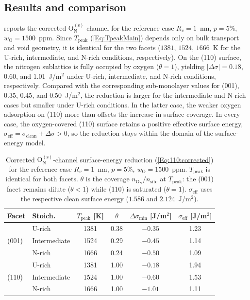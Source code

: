 \documentclass[preprint,12pt,sort&compress]{elsarticle}
\newcommand{\?}{\stackrel{?}{=}}
\begin{document}
\subsection{Results and comparison}
\label{App:110:results}

 reports the corrected $\text{O}_\text{N}^{(\text{s})}$ channel for the reference case $R_v=1$~nm, $p=5\%$, $w_\text{O}=1500$~ppm. Since $T_\text{peak}$ (\cref{Eq:TpeakMain}) depends only on bulk transport and void geometry, it is identical for the two facets ($1381$, $1524$, $1666$~K for the U-rich, intermediate, and N-rich conditions, respectively). On the (110) surface, the nitrogen sublattice is fully occupied by oxygen ($\theta=1$), yielding $|\Delta\sigma|=0.18$, $0.60$, and $1.01$~J/m$^2$ under U-rich, intermediate, and N-rich conditions, respectively. Compared with the corresponding sub-monolayer values for (001), $0.35$, $0.45$, and
$0.50$~J/m$^2$, the reduction is larger for the intermediate and N-rich cases but smaller under U-rich conditions. In the latter case, the weaker oxygen adsorption on (110) more than offsets the increase in surface coverage. In every case, the oxygen-covered (110) surface retains a positive effective surface energy, $\sigma_\text{eff}=\sigma_\text{clean}+\Delta\sigma>0$, so the reduction stays within the domain of the surface-energy model.

\begin{table}[h!]
\centering
\footnotesize
\caption{Corrected $\text{O}_\text{N}^{(\text{s})}$-channel surface-energy
reduction (\cref{Eq:110:corrected}) for the reference case $R_v=1$~nm, $p=5\%$,
$w_\text{O}=1500$~ppm. $T_\text{peak}$ is identical for both facets. $\theta$ is
the coverage $n_{\text{O}_\text{N}}/n_\text{site}$ at $T_\text{peak}$: the (001)
facet remains dilute ($\theta<1$) while (110) is saturated ($\theta=1$).
$\sigma_\text{eff}$ uses the respective clean surface energy ($1.586$ and
$2.124$~J/m$^2$).}
\begin{tabular}{llcccc}
\hline
Facet & Stoich. & $T_\text{peak}$ [K] & $\theta$ &
$\Delta\sigma_\text{min}$ [J/m$^2$] & $\sigma_\text{eff}$ [J/m$^2$] \\
\hline
\multirow{3}{*}{(001)}
 & U-rich       & 1381 & 0.38 & $-0.35$ & 1.23 \\
 & Intermediate & 1524 & 0.29 & $-0.45$ & 1.14 \\
 & N-rich       & 1666 & 0.24 & $-0.50$ & 1.09 \\
\hline
\multirow{3}{*}{(110)}
 & U-rich       & 1381 & 1.00 & $-0.18$ & 1.94 \\
 & Intermediate & 1524 & 1.00 & $-0.60$ & 1.53 \\
 & N-rich       & 1666 & 1.00 & $-1.01$ & 1.11 \\
\hline
\end{tabular}
\label{Tab:110:results}
\end{table}
\end{document}
